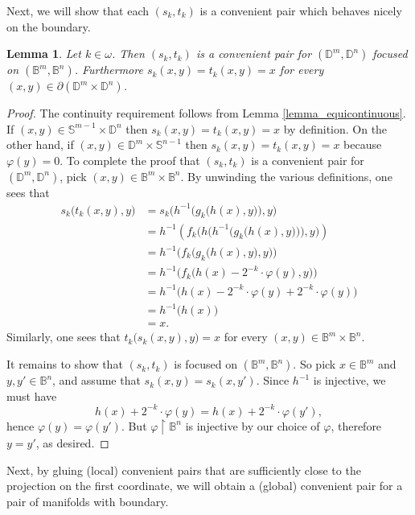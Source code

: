 \documentclass{amsart}
\theoremstyle{plain}
\newtheorem{lemma}[theorem]{Lemma}
\theoremstyle{definition}
\newcommand{\re}{\upharpoonright}
\newcommand{\BBB}{\mathbb{B}}
\newcommand{\DDD}{\mathbb{D}}
\newcommand{\SSS}{\mathbb{S}}
\begin{document}
Next, we will show that each $(s_k,t_k)$ is a convenient pair which behaves nicely on the boundary.

\begin{lemma}\label{lemma_local_convenient_pair}
Let $k\in\omega$. Then $(s_k,t_k)$ is a convenient pair for $(\DDD^m,\DDD^n)$ focused on $(\BBB^m,\BBB^n)$. Furthermore $s_k(x,y)=t_k(x,y)=x$ for every $(x,y)\in\partial(\DDD^m\times\DDD^n)$.
\end{lemma}
\begin{proof}
The continuity requirement follows from Lemma \ref{lemma_equicontinuous}. If $(x,y)\in\SSS^{m-1}\times\DDD^n$ then $s_k(x,y)=t_k(x,y)=x$ by definition. On the other hand, if $(x,y)\in\DDD^m\times\SSS^{n-1}$ then $s_k(x,y)=t_k(x,y)=x$ because $\varphi(y)=0$. To complete the proof that $(s_k,t_k)$ is a convenient pair for $(\DDD^m,\DDD^n)$, pick $(x,y)\in\BBB^m\times\BBB^n$. By unwinding the various definitions, one sees that
\begin{align}
s_k\big(t_k(x,y),y\big)&=s_k\bigg(h^{-1}\Big(g_k\big(h(x),y\big)\Big),y\bigg)\nonumber\\\nonumber
&=h^{-1}\left(f_k\Bigg(h\bigg(h^{-1}\Big(g_k\big(h(x),y\big)\Big)\bigg),y\Bigg)\right)\nonumber\\
&=h^{-1}\bigg(f_k\Big(g_k\big(h(x),y\big),y\Big)\bigg)\nonumber\\
&=h^{-1}\Big(f_k\big(h(x)-2^{-k}\cdot\varphi(y),y\big)\Big)\nonumber\\
&=h^{-1}\big(h(x)-2^{-k}\cdot\varphi(y)+2^{-k}\cdot\varphi(y)\big)\nonumber\\
&=h^{-1}\big(h(x)\big)\nonumber\\
&=x.\nonumber
\end{align}
Similarly, one sees that $t_k\big(s_k(x,y),y\big)=x$ for every $(x,y)\in\BBB^m\times\BBB^n$.

It remains to show that $(s_k,t_k)$ is focused on $(\BBB^m,\BBB^n)$. So pick $x\in\BBB^m$ and $y,y'\in\BBB^n$, and assume that $s_k(x,y)=s_k(x,y')$. Since $h^{-1}$ is injective, we must have
$$
h(x)+2^{-k}\cdot\varphi(y)=h(x)+2^{-k}\cdot\varphi(y'),
$$
hence $\varphi(y)=\varphi(y')$. But $\varphi\re\BBB^n$ is injective by our choice of $\varphi$, therefore $y=y'$, as desired.
\end{proof}

Next, by gluing (local) convenient pairs that are sufficiently close to the projection on the first coordinate, we will obtain a (global) convenient pair for a pair of manifolds with boundary.
\end{document}
